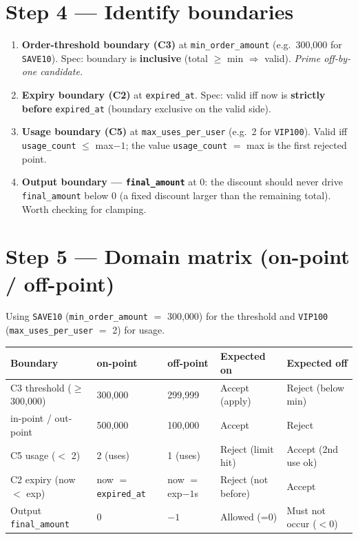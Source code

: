 \documentclass[11pt,a4paper]{article}
\newcommand{\code}[1]{\texttt{#1}}
\begin{document}
\section{Step 4 --- Identify boundaries}

\begin{enumerate}[leftmargin=1.4em]
  \item \textbf{Order-threshold boundary (C3)} at \code{min\_order\_amount}
        (e.g.\ 300{,}000 for \code{SAVE10}). Spec: boundary is \textbf{inclusive}
        (total $\ge$ min $\Rightarrow$ valid). \emph{Prime off-by-one candidate.}
  \item \textbf{Expiry boundary (C2)} at \code{expired\_at}. Spec: valid iff now is
        \textbf{strictly before} \code{expired\_at} (boundary exclusive on the valid side).
  \item \textbf{Usage boundary (C5)} at \code{max\_uses\_per\_user} (e.g.\ 2 for
        \code{VIP100}). Valid iff \code{usage\_count} $\le$ max$-1$; the value
        \code{usage\_count} $=$ max is the first rejected point.
  \item \textbf{Output boundary --- \code{final\_amount}} at 0: the discount should
        never drive \code{final\_amount} below 0 (a fixed discount larger than the
        remaining total). Worth checking for clamping.
\end{enumerate}

\section{Step 5 --- Domain matrix (on-point / off-point)}

Using \code{SAVE10} (\code{min\_order\_amount} $=$ 300{,}000) for the threshold and
\code{VIP100} (\code{max\_uses\_per\_user} $=$ 2) for usage.

\begin{center}
\begin{longtable}{@{}L{4.2cm} C{2.0cm} C{2.0cm} C{2.6cm} C{2.6cm}@{}}
\toprule
\textbf{Boundary} & \textbf{on-point} & \textbf{off-point} & \textbf{Expected on} & \textbf{Expected off} \\
\midrule
\endhead
C3 threshold ($\ge$ 300{,}000) & 300{,}000 & 299{,}999 & Accept (apply) & Reject (below min) \\
\quad in-point / out-point     & 500{,}000 & 100{,}000 & Accept & Reject \\
\midrule
C5 usage ($<$ 2)               & 2 (uses) & 1 (uses) & Reject (limit hit) & Accept (2nd use ok) \\
\midrule
C2 expiry (now $<$ exp)        & now $=$ \code{expired\_at} & now $=$ exp$-1$s & Reject (not before) & Accept \\
\midrule
Output \code{final\_amount}    & 0 & $-1$ & Allowed (=0) & Must not occur ($<$0) \\
\bottomrule
\end{longtable}
\end{center}
\end{document}
